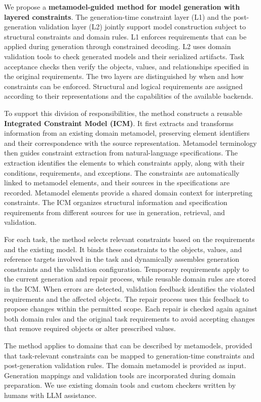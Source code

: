 \documentclass[pdflatex,iicol,sn-mathphys-num]{sn-jnl}
\begin{document}
We propose a \textbf{metamodel-guided method for model generation with layered constraints}. The generation-time constraint layer (L1) and the post-generation validation layer (L2) jointly support model construction subject to structural constraints and domain rules. L1 enforces requirements that can be applied during generation through constrained decoding. L2 uses domain validation tools to check generated models and their serialized artifacts. Task acceptance checks then verify the objects, values, and relationships specified in the original requirements. The two layers are distinguished by when and how constraints can be enforced. Structural and logical requirements are assigned according to their representations and the capabilities of the available backends.

To support this division of responsibilities, the method constructs a reusable \textbf{Integrated Constraint Model (ICM)}. It first extracts and transforms information from an existing domain metamodel, preserving element identifiers and their correspondence with the source representation. Metamodel terminology then guides constraint extraction from natural-language specifications. The extraction identifies the elements to which constraints apply, along with their conditions, requirements, and exceptions. The constraints are automatically linked to metamodel elements, and their sources in the specifications are recorded. Metamodel elements provide a shared domain context for interpreting constraints. The ICM organizes structural information and specification requirements from different sources for use in generation, retrieval, and validation.

For each task, the method selects relevant constraints based on the requirements and the existing model. It binds these constraints to the objects, values, and reference targets involved in the task and dynamically assembles generation constraints and the validation configuration. Temporary requirements apply to the current generation and repair process, while reusable domain rules are stored in the ICM. When errors are detected, validation feedback identifies the violated requirements and the affected objects. The repair process uses this feedback to propose changes within the permitted scope. Each repair is checked again against both domain rules and the original task requirements to avoid accepting changes that remove required objects or alter prescribed values.

The method applies to domains that can be described by metamodels, provided that task-relevant constraints can be mapped to generation-time constraints and post-generation validation rules. The domain metamodel is provided as input. Generation mappings and validation tools are incorporated during domain preparation. We use existing domain tools and custom checkers written by humans with LLM assistance.
\end{document}
